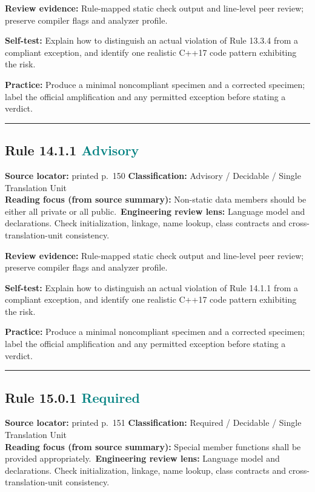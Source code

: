\documentclass[10pt,letterpaper]{article}
\begin{document}
\textbf{Review evidence:} Rule-mapped static check output and line-level peer review; preserve compiler flags and analyzer profile.

\textbf{Self-test:} Explain how to distinguish an actual violation of Rule 13.3.4 from a compliant exception, and identify one realistic C++17 code pattern exhibiting the risk.\par
\textbf{Practice:} Produce a minimal noncompliant specimen and a corrected specimen; label the official amplification and any permitted exception before stating a verdict.
\smallskip\hrule\smallskip
\subsection*{Rule 14.1.1 \enspace \texorpdfstring{\small\textcolor{teal}{Advisory}}{Advisory}}
\noindent\textbf{Source locator:} printed p.~150 \quad\textbf{Classification:} Advisory / Decidable / Single Translation Unit\\
\textbf{Reading focus (from source summary):} Non-static data members should be either all private or all public.\
\textbf{Engineering review lens:} Language model and declarations. Check initialization, linkage, name lookup, class contracts and cross-translation-unit consistency.

\textbf{Review evidence:} Rule-mapped static check output and line-level peer review; preserve compiler flags and analyzer profile.

\textbf{Self-test:} Explain how to distinguish an actual violation of Rule 14.1.1 from a compliant exception, and identify one realistic C++17 code pattern exhibiting the risk.\par
\textbf{Practice:} Produce a minimal noncompliant specimen and a corrected specimen; label the official amplification and any permitted exception before stating a verdict.
\smallskip\hrule\smallskip
\subsection*{Rule 15.0.1 \enspace \texorpdfstring{\small\textcolor{teal}{Required}}{Required}}
\noindent\textbf{Source locator:} printed p.~151 \quad\textbf{Classification:} Required / Decidable / Single Translation Unit\\
\textbf{Reading focus (from source summary):} Special member functions shall be provided appropriately.\
\textbf{Engineering review lens:} Language model and declarations. Check initialization, linkage, name lookup, class contracts and cross-translation-unit consistency.
\end{document}

